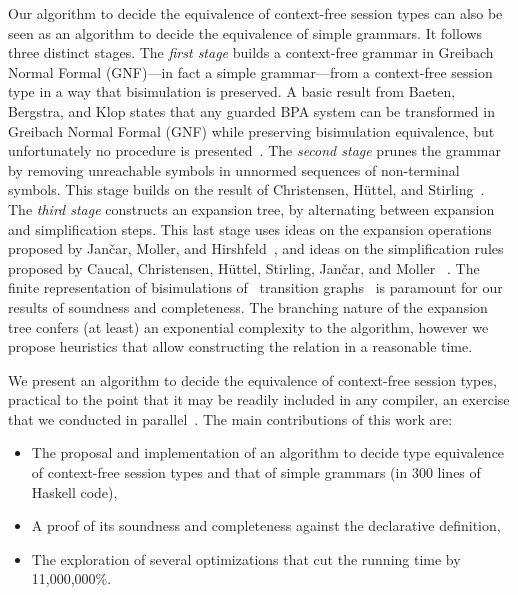 Our algorithm to decide the equivalence of context-free session types
can also be seen as an algorithm to decide the equivalence of simple
grammars. It follows three distinct stages.
%
The \emph{first stage} builds a context-free grammar in Greibach
Normal Formal (GNF)---in fact a simple grammar---from a context-free
session type in a way that bisimulation is preserved.  A basic result
from Baeten, Bergstra, and Klop states that any guarded BPA system can
be transformed in Greibach Normal Formal (GNF) while preserving
bisimulation equivalence, but unfortunately no procedure is
presented~\cite{baeten1993decidability}.
%
The \emph{second stage} prunes the grammar by removing unreachable
symbols in unnormed sequences of non-terminal symbols. This stage
builds on the result of Christensen, H\"uttel, and 
Stirling~\cite{DBLP:journals/iandc/ChristensenHS95}.
%
The \emph{third stage} constructs an expansion tree, by alternating
between expansion and simplification steps.  This last stage uses
ideas on the expansion operations proposed by Jan\v car, Moller, and
Hirshfeld~\cite{hirshfeld1996bisimulation,janvcar1999techniques}, and
ideas on the simplification rules proposed by Caucal, Christensen,
H\"uttel, Stirling, Jan\v car, and Moller
~\cite{caucal1986decidabilite,
  DBLP:journals/iandc/ChristensenHS95,janvcar1999techniques}.  The
finite representation of bisimulations of \BPA\ transition
graphs~\cite{caucal1986decidabilite,
  DBLP:journals/iandc/ChristensenHS95} is paramount for our results of
soundness and completeness. The branching nature of the expansion tree
confers (at least) an exponential complexity to the algorithm, however
we propose heuristics that allow constructing the relation in a
reasonable time.

We present an algorithm to decide the equivalence of context-free
session types, practical to the point that it may be readily included
in any compiler, an exercise that we conducted in
parallel~\cite{almeida.etal_freest-functional-language}.
%
The main contributions of this work are:
%
\begin{itemize}
\item The proposal and implementation of an algorithm to decide type
  equivalence of context-free session types and that of simple
  grammars (in 300 lines of Haskell code),
\item A proof of its soundness and completeness against the
  declarative definition,
\item The exploration of several optimizations that cut the running
  time by 11,000,000\%.
\end{itemize}

